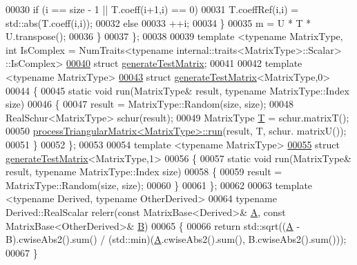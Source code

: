 \begin{DoxyCode}
00030       \textcolor{keywordflow}{if} (i == size - 1 || T.coeff(i+1,i) == 0)
00031         T.coeffRef(i,i) = std::abs(T.coeff(i,i));
00032       \textcolor{keywordflow}{else}
00033         ++i;
00034     \}
00035     m = U * T * U.transpose();
00036   \}
00037 \};
00038 
00039 template <typename MatrixType, int IsComplex = NumTraits<typename internal::traits<MatrixType>::Scalar>
      ::IsComplex>
\hyperlink{structgenerate_test_matrix}{00040} \textcolor{keyword}{struct }\hyperlink{structgenerate_test_matrix}{generateTestMatrix};
00041 
00042 \textcolor{keyword}{template} <\textcolor{keyword}{typename} MatrixType>
\hyperlink{structgenerate_test_matrix_3_01_matrix_type_00_010_01_4}{00043} \textcolor{keyword}{struct }\hyperlink{structgenerate_test_matrix}{generateTestMatrix}<MatrixType,0>
00044 \{
00045   \textcolor{keyword}{static} \textcolor{keywordtype}{void} run(MatrixType& result, \textcolor{keyword}{typename} MatrixType::Index size)
00046   \{
00047     result = MatrixType::Random(size, size);
00048     RealSchur<MatrixType> schur(result);
00049     MatrixType \hyperlink{group___sparse_core___module}{T} = schur.matrixT();
00050     \hyperlink{structprocess_triangular_matrix}{processTriangularMatrix<MatrixType>::run}(result, T, schur.
      matrixU());
00051   \}
00052 \};
00053 
00054 \textcolor{keyword}{template} <\textcolor{keyword}{typename} MatrixType>
\hyperlink{structgenerate_test_matrix_3_01_matrix_type_00_011_01_4}{00055} \textcolor{keyword}{struct }\hyperlink{structgenerate_test_matrix}{generateTestMatrix}<MatrixType,1>
00056 \{
00057   \textcolor{keyword}{static} \textcolor{keywordtype}{void} run(MatrixType& result, \textcolor{keyword}{typename} MatrixType::Index size)
00058   \{
00059     result = MatrixType::Random(size, size);
00060   \}
00061 \};
00062 
00063 \textcolor{keyword}{template} <\textcolor{keyword}{typename} Derived, \textcolor{keyword}{typename} OtherDerived>
00064 \textcolor{keyword}{typename} Derived::RealScalar relerr(\textcolor{keyword}{const} MatrixBase<Derived>& \hyperlink{group___core___module_class_eigen_1_1_matrix}{A}, \textcolor{keyword}{const} MatrixBase<OtherDerived>& 
      \hyperlink{group___core___module_class_eigen_1_1_matrix}{B})
00065 \{
00066   \textcolor{keywordflow}{return} std::sqrt((\hyperlink{group___core___module_class_eigen_1_1_matrix}{A} - B).cwiseAbs2().sum() / (std::min)(\hyperlink{group___core___module_class_eigen_1_1_matrix}{A}.cwiseAbs2().sum(), B.cwiseAbs2().sum()));
00067 \}
\end{DoxyCode}
